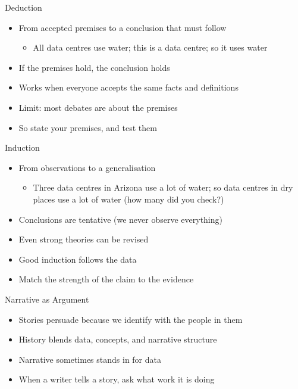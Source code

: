 \documentclass[aspectratio=169]{beamer}
\begin{document}
\begin{frame}{Deduction}
\begin{itemize}
  \item From accepted premises to a conclusion that must follow
    \begin{itemize}
    \item All data centres use water; this is a data centre; so it uses water
    \end{itemize}
  \item If the premises hold, the conclusion holds
  \item Works when everyone accepts the same facts and definitions
  \item Limit: most debates are about the premises
  \item So state your premises, and test them
\end{itemize}
\end{frame}

\begin{frame}{Induction}
\begin{itemize}
  \item From observations to a generalisation
    \begin{itemize}
    \item Three data centres in Arizona use a lot of water; so data centres in dry places use a lot of water (how many did you check?)
    \end{itemize}
  \item Conclusions are tentative (we never observe everything)
  \item Even strong theories can be revised
  \item Good induction follows the data
  \item Match the strength of the claim to the evidence
\end{itemize}
\end{frame}

\begin{frame}{Narrative as Argument}
\begin{itemize}
  \item Stories persuade because we identify with the people in them
  \item History blends data, concepts, and narrative structure
  \item Narrative sometimes stands in for data
  \item When a writer tells a story, ask what work it is doing
\end{itemize}
\end{frame}
\end{document}
